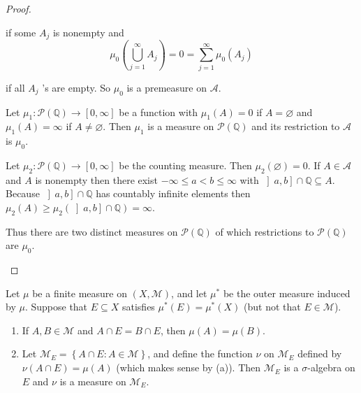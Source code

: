\begin{proof}
\begin{enumerate}[itemsep=0pt,label=\textbf{\alph*.}]
              if some \( A_{j} \) is nonempty and
              \[
                  \mu_{0}\left( \bigcup_{j=1}^{\infty} A_{j} \right) = 0 = \sum_{j=1}^{\infty} \mu_{0}(A_{j})
              \]

              if all \( A_{j} \) 's are empty. So \( \mu_{0} \) is a premeasure on \( \mathcal{A} \).

              Let \( \mu_{1}: \mathcal{P}(\mathbb{Q}) \to \left\lbrack 0, \infty \right\rbrack \) be a function with \( \mu_{1}(A) = 0 \) if \( A = \varnothing \) and \( \mu_{1}(A) = \infty \) if \( A \ne \varnothing \). Then \( \mu_{1} \) is a measure on \( \mathcal{P}(\mathbb{Q}) \) and its restriction to \( \mathcal{A} \) is \( \mu_{0} \).

              Let \( \mu_{2}: \mathcal{P}(\mathbb{Q}) \to \left\lbrack 0, \infty \right\rbrack \) be the counting measure. Then \( \mu_{2}(\varnothing) = 0 \). If \( A \in \mathcal{A} \) and \( A \) is nonempty then there exist \( -\infty \le a < b \le \infty \) with \( \left\rbrack a, b \right\rbrack \cap \mathbb{Q} \subseteq A \). Because \( \left\rbrack a, b \right\rbrack \cap \mathbb{Q} \) has countably infinite elements then \( \mu_{2}(A) \ge \mu_{2}(\left\rbrack a, b \right\rbrack \cap \mathbb{Q}) = \infty \).

              Thus there are two distinct measures on \( \mathcal{P}(\mathbb{Q}) \) of which restrictions to \( \mathcal{P}(\mathbb{Q}) \) are \( \mu_{0} \).
    \end{enumerate}
\end{proof}

\newpage

\begin{exercise}
    Let \( \mu \) be a finite measure on \( (X, \mathcal{M}) \), and let \( \mu^{\ast} \) be the outer measure induced by \( \mu \). Suppose that \( E \subseteq X \) satisfies \( \mu^{\ast}(E) = \mu^{\ast}(X) \) (but not that \( E \in \mathcal{M} \)).
    \begin{enumerate}[itemsep=0pt,label=\textbf{\alph*.}]
        \item If \( A, B \in \mathcal{M} \) and \( A \cap E = B \cap E \), then \( \mu(A) = \mu(B) \).
        \item Let \( \mathcal{M}_{E} = \left\{ A \cap E : A \in \mathcal{M} \right\} \), and define the function \( \nu \) on \( \mathcal{M}_{E} \) defined by \( \nu(A \cap E) = \mu(A) \) (which makes sense by (a)). Then \( \mathcal{M}_{E} \) is a \( \sigma \)-algebra on \( E \) and \( \nu \) is a measure on \( \mathcal{M}_{E} \).
    \end{enumerate}
\end{exercise}

